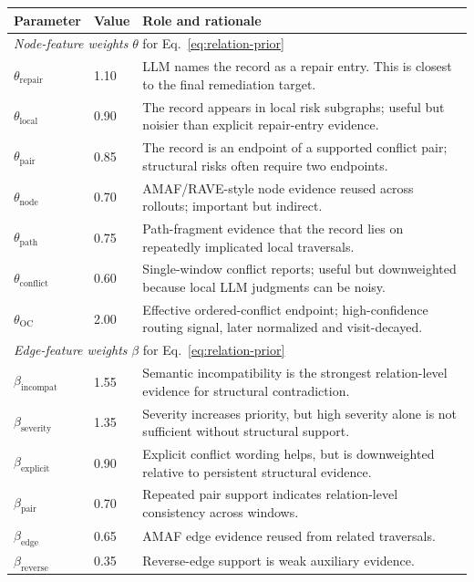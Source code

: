 \documentclass[11pt]{article}
\begin{document}
\begin{table}[t]
\centering
\small
\begin{tabular}{p{}p{}p{}}
\toprule
Parameter & Value & Role and rationale \\
\midrule
\multicolumn{3}{l}{\textit{Node-feature weights }$\theta$ for Eq.~\ref{eq:relation-prior}}\\
$\theta_{\mathrm{repair}}$ & 1.10 & LLM names the record as a repair entry. This is closest to the final remediation target.\\
$\theta_{\mathrm{local}}$ & 0.90 & The record appears in local risk subgraphs; useful but noisier than explicit repair-entry evidence.\\
$\theta_{\mathrm{pair}}$ & 0.85 & The record is an endpoint of a supported conflict pair; structural risks often require two endpoints.\\
$\theta_{\mathrm{node}}$ & 0.70 & AMAF/RAVE-style node evidence reused across rollouts; important but indirect.\\
$\theta_{\mathrm{path}}$ & 0.75 & Path-fragment evidence that the record lies on repeatedly implicated local traversals.\\
$\theta_{\mathrm{conflict}}$ & 0.60 & Single-window conflict reports; useful but downweighted because local LLM judgments can be noisy.\\
$\theta_{\mathrm{OC}}$ & 2.00 & Effective ordered-conflict endpoint; high-confidence routing signal, later normalized and visit-decayed.\\
\midrule
\multicolumn{3}{l}{\textit{Edge-feature weights }$\beta$ for Eq.~\ref{eq:relation-prior}}\\
$\beta_{\mathrm{incompat}}$ & 1.55 & Semantic incompatibility is the strongest relation-level evidence for structural contradiction.\\
$\beta_{\mathrm{severity}}$ & 1.35 & Severity increases priority, but high severity alone is not sufficient without structural support.\\
$\beta_{\mathrm{explicit}}$ & 0.90 & Explicit conflict wording helps, but is downweighted relative to persistent structural evidence.\\
$\beta_{\mathrm{pair}}$ & 0.70 & Repeated pair support indicates relation-level consistency across windows.\\
$\beta_{\mathrm{edge}}$ & 0.65 & AMAF edge evidence reused from related traversals.\\
$\beta_{\mathrm{reverse}}$ & 0.35 & Reverse-edge support is weak auxiliary evidence.\\

\end{tabular}
\end{table}
\end{document}
